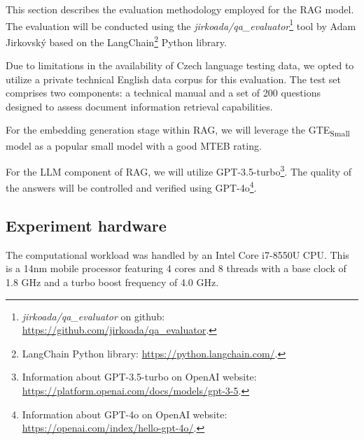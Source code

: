 This section describes the evaluation methodology employed for the \ac{RAG} model.
The evaluation will be conducted using the \textit{jirkoada/qa\_evaluator}\footnote{\textit{jirkoada/qa\_evaluator} on github: \url{https://github.com/jirkoada/qa_evaluator}.} tool by Adam Jirkovský based on the LangChain\footnote{LangChain Python library: \url{https://python.langchain.com/}.} Python library.

Due to limitations in the availability of Czech language testing data, we opted to utilize a private technical English data corpus for this evaluation.
The test set comprises two components: a technical manual and a set of 200 questions designed to assess document information retrieval capabilities.

For the embedding generation stage within \ac{RAG}, we will leverage the GTE\textsubscript{Small} model as a popular small model with a good \ac{MTEB} rating.

For the \ac{LLM} component of \ac{RAG}, we will utilize GPT-3.5-turbo\footnote{\label{footnote:gpt-3.5-turbo}Information about GPT-3.5-turbo on OpenAI website: \url{https://platform.openai.com/docs/models/gpt-3-5}.}.
The quality of the answers will be controlled and verified using GPT-4o\footnote{\label{footnote:gpt-4o}Information about GPT-4o on OpenAI website: \url{https://openai.com/index/hello-gpt-4o/}.}.


\subsection{Experiment hardware}
The computational workload was handled by an Intel Core i7-8550U CPU.
This is a 14nm mobile processor featuring 4 cores and 8 threads with a base clock of 1.8 GHz and a turbo boost frequency of 4.0 GHz.



